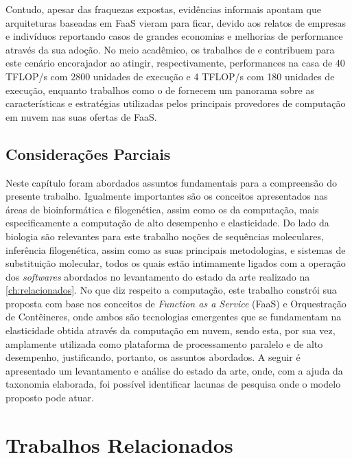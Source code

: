 \documentclass[english,brazilian]{UNISINOSmonografia} %
\begin{document}
Contudo, apesar das fraquezas expostas, evidências informais apontam que arquiteturas baseadas em FaaS vieram para ficar, devido aos relatos de empresas e indivíduos reportando casos de grandes economias e melhorias de performance através da sua adoção.
No meio acadêmico, os trabalhos de  e  contribuem para este cenário encorajador ao atingir, respectivamente, performances na casa de 40 TFLOP/s com 2800 unidades de execução e  4 TFLOP/s com 180 unidades de execução, enquanto trabalhos como o de  fornecem um panorama sobre as características e estratégias utilizadas pelos principais provedores de computação em nuvem nas suas ofertas de FaaS.


\section{Considerações Parciais}

Neste capítulo foram abordados assuntos fundamentais para a compreensão do presente trabalho.
%
Igualmente importantes são os conceitos apresentados nas áreas de bioinformática e filogenética, assim como os da computação, mais especificamente a computação de alto desempenho e elasticidade.
%
Do lado da biologia são relevantes para este trabalho noções de sequências moleculares, inferência filogenética, assim como as suas principais metodologias, e sistemas de substituição molecular, todos os quais estão intimamente ligados com a operação dos \textit{softwares} abordados no levantamento do estado da arte realizado na \autoref{ch:relacionados}.
%
No que diz respeito a computação, este trabalho constrói sua proposta com base nos conceitos de \textit{Function as a Service} (FaaS) e Orquestração de Contêineres, onde ambos são tecnologias emergentes que se fundamentam na elasticidade obtida através da computação em nuvem, sendo esta, por sua vez, amplamente utilizada como plataforma de processamento paralelo e de alto desempenho, justificando, portanto, os assuntos abordados.
%
A seguir é apresentado um levantamento e análise do estado da arte, onde, com a ajuda da taxonomia elaborada, foi possível identificar lacunas de pesquisa onde o modelo proposto pode atuar.




\chapter{Trabalhos Relacionados}
\label{ch:relacionados}
\end{document}
